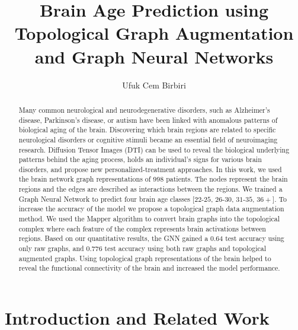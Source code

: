 \documentclass[runningheads]{llncs}
\begin{document}
%
\title{Brain Age Prediction using Topological Graph Augmentation and Graph Neural Networks}



\author{ Ufuk Cem Birbiri}
 








\maketitle              %
%
\begin{abstract}



Many common neurological and neurodegenerative disorders, such as Alzheimer’s disease, Parkinson's disease, or autism have been linked with anomalous patterns of biological aging of
the brain. Discovering which brain regions are related to specific neurological disorders or cognitive stimuli became an essential field of neuroimaging research. Diffusion Tensor Images (DTI) can be used to reveal the biological underlying patterns behind the aging process, holds an individual's signs for various brain disorders, and
propose new personalized-treatment approaches. In this work, we used the brain network graph representations of 998 patients. The nodes represent the brain regions and the edges are described as interactions between the regions. We trained a Graph Neural Network to predict four brain age classes [$22$-$25$, $26$-$30$, $31$-$35$, $36+$]. To increase the accuracy of the model we propose a topological graph data augmentation method. We used the Mapper algorithm to convert brain graphs into the topological complex where each feature of the complex represents brain activations between regions. Based on our quantitative results, the GNN gained a 0.64 test accuracy using only raw graphs, and 0.776 test accuracy using both raw graphs and topological augmented graphs. Using topological graph representations of the brain helped to reveal the functional connectivity of the brain and increased the model performance.




\end{abstract}
%
%
%
\section{Introduction and Related Work}
\end{document}
